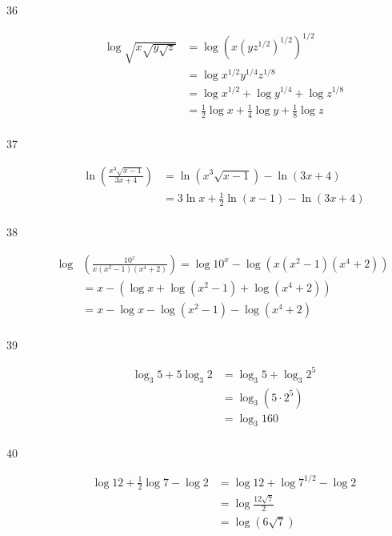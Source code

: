 \documentclass{exam}
\begin{document}
\begin{description}
      \item[36] 
        \begin{align*}
          \log \sqrt{x \sqrt{y \sqrt{z}}} &= \log (x (y z^{1/2})^{1/2})^{1/2} \\
                                          &= \log x^{1/2}y^{1/4}z^{1/8} \\
                                          &= \log x^{1/2} + \log y^{1/4} + \log z^{1/8} \\
                                          &= \boxed{\frac{1}{2} \log x + \frac{1}{4} \log y + \frac{1}{8} \log z}  \\
        \end{align*}

      \item[37] 
        \begin{align*}
          \ln \left( \frac{x^3 \sqrt{x - 1}}{3x + 4} \right) &= \ln (x^3 \sqrt{x - 1}) - \ln (3x + 4) \\
                                                             &= \boxed{3 \ln x + \frac{1}{2} \ln (x - 1) - \ln (3x + 4)} \\
        \end{align*}

      \item[38] 
        \begin{align*}
          \log & \left( \frac{10^x}{x(x^2 - 1)(x^4 + 2)} \right) = \log 10^x - \log (x(x^2 - 1)(x^4 + 2)) \\
                                                               &= x - ( \log x + \log (x^2 - 1) + \log (x^4 + 2)) \\
                                                               &= \boxed{x - \log x - \log (x^2 - 1) - \log (x^4 + 2)} \\
        \end{align*}

      \item[39] 
        \begin{align*}
          \log_3 5 + 5 \log_3 2 &= \log_3 5 + \log_3 2^5 \\
                                &= \log_3 (5 \cdot 2^5) \\
                                &= \boxed{\log_3 160} \\
        \end{align*}

      \item[40] 
        \begin{align*}
          \log 12 + \frac{1}{2} \log 7 - \log 2 &= \log 12 + \log 7^{1/2} - \log 2 \\
                                                &= \log \frac{12 \sqrt{7}}{2} \\
                                                &= \boxed{\log (6 \sqrt{7})} \\
        \end{align*}


\end{description}
\end{document}
